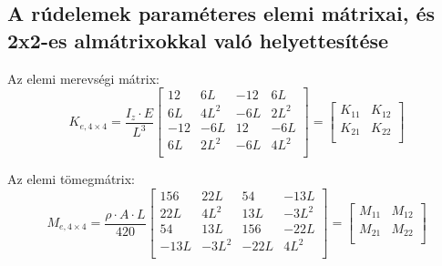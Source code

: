\documentclass{article}
\begin{document}
	\begin{figure}[h!]		
		\begin{center}	
		\end{center}	
	\caption{}
	\end{figure}
	
	\subsection{A rúdelemek paraméteres elemi mátrixai, és 2x2-es almátrixokkal való helyettesítése}
	
	
		Az elemi merevségi mátrix:
		\begin{equation}
		K_{e,4\times4}= \frac{I_{z} \cdot E}{L^3}  
		\begin{bmatrix}
		12&6L&-12&6L\\
		6L&4L^2&-6L&2L^2\\
		-12&-6L&12&-6L\\
		6L&2L^2&-6L&4L^2\\
		\end{bmatrix}
		=\begin{bmatrix}
		K_{11} &K_{12} \\
		K_{21} &K_{22} \\
		\end{bmatrix}
		\end{equation}
		
		Az elemi tömegmátrix:
		\begin{equation}
		M_{e,4\times4}= \frac{\rho \cdot A \cdot L}{420}  
		\begin{bmatrix}
		156&22L&54&-13L\\
		22L&4L^2&13L&-3L^2\\
		54&13L&156&-22L\\
		-13L&-3L^2&-22L&4L^2\\
		\end{bmatrix}
		=\begin{bmatrix}
		M_{11} &M_{12} \\
		M_{21} &M_{22} \\
		\end{bmatrix}
		\end{equation}
	
\end{document}
